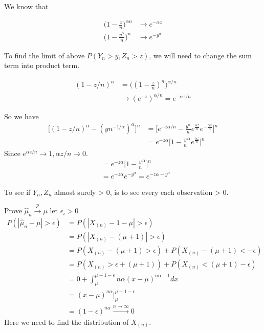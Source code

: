 We know that 

\begin{align*}
	\Big(1 - \frac{z}{n}\Big)^{\alpha n}  & \rightarrow e^{-\alpha z}\\
    \Big(1 - \frac{y^{\alpha}}{n}\Big)^{ n}  & \rightarrow e^{- y^{\alpha}}
\end{align*} 

To find the limit of above $P(Y_n > y, Z_n >z)$, we will need to change the sum term into product term. 

	\begin{align*}
		(1- z/n)^{\alpha} &= \Big((1- \frac{z}{n})^{n}\Big)^{\alpha/n}\\
		& \rightarrow (e^{-z})^{\alpha/n} = e^{-\alpha z/n}
	\end{align*} 

So we have 
	\begin{align*}
	\Bigg[ (1- z/n)^{\alpha} - (yn^{-1/\alpha})^{\alpha} \Bigg]^n &= \Bigg[ e^{- z \alpha/n} - \frac{y^{\alpha}}{n} e^{\frac{\alpha z}{n}}  e^{- \frac{\alpha z}{n}} \Bigg]^n \\
	&= e^{-z \alpha} \Bigg[ 1- \frac{y}{n}^{\alpha} e^{\frac{\alpha z}{n}}\Bigg]^n
\end{align*} 
	Since $e^{\alpha z/n} \rightarrow 1, \alpha z/n \rightarrow 0$. 
	\begin{align*}
	&= e^{-z \alpha} \Bigg[ 1- \frac{y}{n}^{\alpha} \Bigg]^n \\
	&= e^{-z \alpha} e^{-y^{\alpha}} = e^{-z \alpha-y^{\alpha}} 
\end{align*} 	
	
To see if $Y_n, Z_n$ almost surely > 0, is to see every each observation > 0. 

Prove $\hat{\mu}_n \xrightarrow {p} \mu$
let $\epsilon_i > 0$
\begin{align*}
	P(|\hat{\mu}_n - \mu| > \epsilon) &= P(| X_{(n)} - 1 - \mu| > \epsilon) \\
	&= P(| X_{(n)} - (\mu + 1)| > \epsilon) \\
	&= P(X_{(n)} - (\mu + 1) > \epsilon) + P(X_{(n)} - (\mu + 1) < -\epsilon) \\
	&= P(X_{(n)}  > \epsilon + (\mu + 1)) + P(X_{(n)} < (\mu + 1)  -\epsilon) \\
	&= 0 + \int_{\mu}^{\mu+1-\epsilon} n \alpha (x-\mu)^{n\alpha -1} dx \\
	&= (x-\mu)^{n \alpha} \Bigg |_{\mu}^{\mu+1 -\epsilon} \\
	&= (1- \epsilon)^{n\alpha} \xrightarrow{n \rightarrow \infty} 0
\end{align*} 
Here we need to find the distribution of $X_{(n)}$. 

